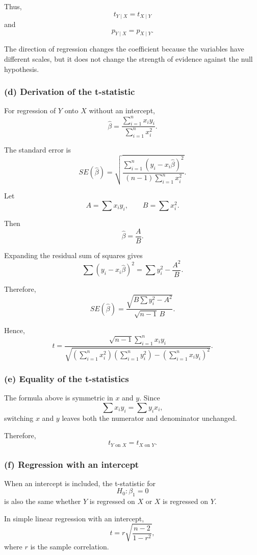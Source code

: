 \documentclass[12pt,a4paper]{article}
\begin{document}
Thus,
\[
\boxed{t_{Y\mid X}=t_{X\mid Y}}
\]
and
\[
\boxed{p_{Y\mid X}=p_{X\mid Y}}.
\]

The direction of regression changes the coefficient because the variables
have different scales, but it does not change the strength of evidence
against the null hypothesis.

\subsubsection*{(d) Derivation of the t-statistic}

For regression of $Y$ onto $X$ without an intercept,
\[
\hat{\beta}
=
\frac{\sum_{i=1}^{n}x_i y_i}
{\sum_{i=1}^{n}x_i^2}.
\]

The standard error is
\[
SE(\hat{\beta})
=
\sqrt{
\frac{\sum_{i=1}^{n}(y_i-x_i\hat{\beta})^2}
{(n-1)\sum_{i=1}^{n}x_i^2}
}.
\]

Let
\[
A=\sum x_i y_i,\qquad B=\sum x_i^2.
\]

Then
\[
\hat{\beta}=\frac{A}{B}.
\]

Expanding the residual sum of squares gives
\[
\sum(y_i-x_i\hat{\beta})^2
=
\sum y_i^2-\frac{A^2}{B}.
\]

Therefore,
\[
SE(\hat{\beta})
=
\frac{\sqrt{B\sum y_i^2-A^2}}
{\sqrt{n-1}\,B}.
\]

Hence,
\[
\boxed{
t=
\frac{
\sqrt{n-1}\sum_{i=1}^{n}x_i y_i
}{
\sqrt{
\left(\sum_{i=1}^{n}x_i^2\right)
\left(\sum_{i=1}^{n}y_i^2\right)
-
\left(\sum_{i=1}^{n}x_i y_i\right)^2
}
}
}.
\]

\subsubsection*{(e) Equality of the t-statistics}

The formula above is symmetric in $x$ and $y$. Since
\[
\sum x_i y_i=\sum y_i x_i,
\]
switching $x$ and $y$ leaves both the numerator and denominator unchanged.

Therefore,
\[
\boxed{t_{Y\text{ on }X}=t_{X\text{ on }Y}}.
\]

\subsubsection*{(f) Regression with an intercept}

When an intercept is included, the t-statistic for
\[
H_0:\beta_1=0
\]
is also the same whether $Y$ is regressed on $X$ or $X$ is regressed on
$Y$.

In simple linear regression with an intercept,
\[
t=r\sqrt{\frac{n-2}{1-r^2}},
\]
where $r$ is the sample correlation.
\end{document}
